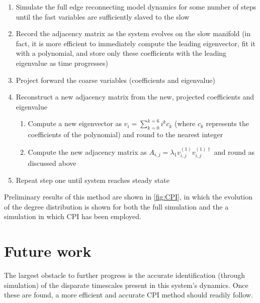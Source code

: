 \documentclass[11pt]{article}
\begin{document}
\begin{enumerate}
\item Simulate the full edge reconnecting model dynamics for some number of steps until the fast variables are sufficiently slaved to the slow
\item Record the adjacency matrix as the system evolves on the slow manifold (in fact, it is more efficient to immediately compute the leading eigenvector, fit it with a polynomial, and store only these coefficients with the leading eigenvalue as time progresses)
\item Project forward the coarse variables (coefficients and eigenvalue)
\item Reconstruct a new adjacency matrix from the new, projected coefficients and eigenvalue
  \begin{enumerate}
  \item Compute a new eigenvector as $v_{i} = \displaystyle\sum\limits_{k=0}^{k=6} i^{k}c_{k}$ (where $c_{k}$ represents the coefficients of the polynomial) and round to the nearest integer
  \item Compute the new adjacency matrix as $A_{i,j}=\lambda_{1}v^{(1)}_{i,j}v^{(1)\dagger}_{i,j}$ and round as discussed above
  \end{enumerate}
\item Repeat step one until system reaches steady state
\end{enumerate}

Preliminary results of this method are shown in \ref{fig:CPI}, in which the evolution of the degree distribution is shown for both the full simulation and the a simulation in which CPI has been employed.

\section*{Future work}
The largest obstacle to further progress is the accurate identification (through simulation) of the disparate timescales present in this system's dynamics. Once these are found, a more efficient and accurate CPI method should readily follow.
\end{document}
